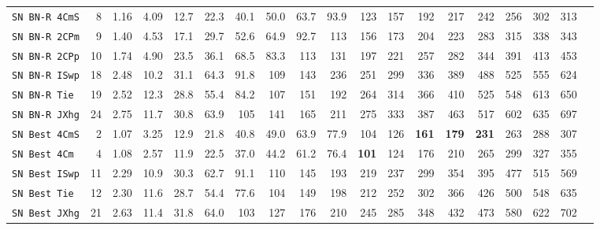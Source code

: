\begin{tabular}{l | r @{~~} r | r@{~~}r@{~~}r@{~~}r@{~~}r@{~~}r@{~~}r@{~~}r@{~~}r@{~~}r@{~~}r@{~~}r@{~~}r@{~~}r@{~~}r@{~~}r|}
\verb+SN BN-R 4CmS+ & 8 & 1.16 & 4.09&12.7&22.3&40.1&50.0&63.7&93.9&123&157&192&217&242&256&302&313\\
\verb+SN BN-R 2CPm+ & 9 & 1.40 & 4.53&17.1&29.7&52.6&64.9&92.7&113&156&173&204&223&283&315&338&343\\
\verb+SN BN-R 2CPp+ & 10 & 1.74 & 4.90&23.5&36.1&68.5&83.3&113&131&197&221&257&282&344&391&413&453\\
\verb+SN BN-R ISwp+ & 18 & 2.48 & 10.2&31.1&64.3&91.8&109&143&236&251&299&336&389&488&525&555&624\\
\verb+SN BN-R Tie + & 19 & 2.52 & 12.3&28.8&55.4&84.2&107&151&192&264&314&366&410&525&548&613&650\\
\verb+SN BN-R JXhg+ & 24 & 2.75 & 11.7&30.8&63.9&105&141&165&211&275&333&387&463&517&602&635&697\smallskip \\
\verb+SN Best 4CmS+ & 2 & 1.07 & 3.25&12.9&21.8&40.8&49.0&63.9&77.9&104&126&\textbf{161}&\textbf{179}&\textbf{231}&263&288&307\\
\verb+SN Best 4Cm + & 4 & 1.08 & 2.57&11.9&22.5&37.0&44.2&61.2&76.4&\textbf{101}&124&176&210&265&299&327&355\\
\verb+SN Best ISwp+ & 11 & 2.29 & 10.9&30.3&62.7&91.1&110&145&193&219&237&299&354&395&477&515&569\\
\verb+SN Best Tie + & 12 & 2.30 & 11.6&28.7&54.4&77.6&104&149&198&212&252&302&366&426&500&548&635\\
\verb+SN Best JXhg+ & 21 & 2.63 & 11.4&31.8&64.0&103&127&176&210&245&285&348&432&473&580&622&702\\
\end{tabular}
